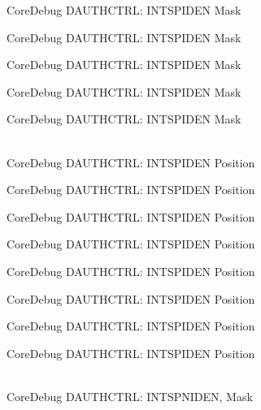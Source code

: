 \begin{DoxyRefList}
\label{deprecated__deprecated000283}%
%
Core\+Debug DAUTHCTRL:\+ INTSPIDEN Mask 

\label{deprecated__deprecated000362}%
%
Core\+Debug DAUTHCTRL:\+ INTSPIDEN Mask 

\label{deprecated__deprecated000438}%
%
Core\+Debug DAUTHCTRL:\+ INTSPIDEN Mask 

\label{deprecated__deprecated000541}%
%
Core\+Debug DAUTHCTRL:\+ INTSPIDEN Mask 

\label{deprecated__deprecated000643}%
%
Core\+Debug DAUTHCTRL:\+ INTSPIDEN Mask  
\item[{\parbox[t]{\linewidth}{Global \doxylink{group__CMSIS__SCB_ga3caef9790e4e2ccbfea77d55315ad59f}{Core\+Debug\+\_\+\+DAUTHCTRL\+\_\+\+INTSPIDEN\+\_\+\+Pos} }}]\hfill \\
\label{deprecated__deprecated000089}%
%
Core\+Debug DAUTHCTRL:\+ INTSPIDEN Position 

\label{deprecated__deprecated000143}%
%
Core\+Debug DAUTHCTRL:\+ INTSPIDEN Position 

\label{deprecated__deprecated000219}%
%
Core\+Debug DAUTHCTRL:\+ INTSPIDEN Position 

\label{deprecated__deprecated000282}%
%
Core\+Debug DAUTHCTRL:\+ INTSPIDEN Position 

\label{deprecated__deprecated000361}%
%
Core\+Debug DAUTHCTRL:\+ INTSPIDEN Position 

\label{deprecated__deprecated000437}%
%
Core\+Debug DAUTHCTRL:\+ INTSPIDEN Position 

\label{deprecated__deprecated000540}%
%
Core\+Debug DAUTHCTRL:\+ INTSPIDEN Position 

\label{deprecated__deprecated000642}%
%
Core\+Debug DAUTHCTRL:\+ INTSPIDEN Position  
\item[{\parbox[t]{\linewidth}{Global \doxylink{group__CMSIS__SCB_gadad0bf68d32cba49c1ea7534122c2752}{Core\+Debug\+\_\+\+DAUTHCTRL\+\_\+\+INTSPNIDEN\+\_\+\+Msk} }}]\hfill \\
\label{deprecated__deprecated000086}%
%
Core\+Debug DAUTHCTRL:\+ INTSPNIDEN, Mask 


\end{DoxyRefList}
